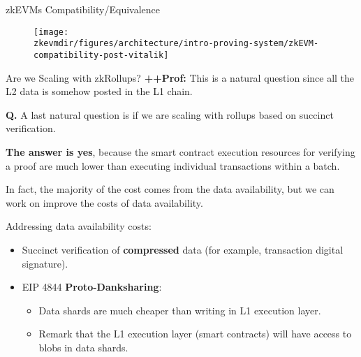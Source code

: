 \begin{frame}{zkEVMs Compatibility/Equivalence}
\begin{figure}
\texttt{[image: \\zkevmdir/figures/architecture/intro-proving-system/zkEVM-compatibility-post-vitalik]}
\end{figure}
\end{frame}




\begin{frame}{Are we Scaling with zkRollups?}
\ifPROF
\footnotesize
\textbf{++Prof:} This is a natural question since all the L2 data is somehow posted in the L1 chain.
\normalsize
\fi

\textbf{Q.} A last natural question is if we are scaling with rollups based on succinct verification.

\textbf{The answer is yes}, because the smart contract execution resources for verifying a proof are much lower
than executing individual transactions within a batch.


In fact, the majority of the cost comes from the data availability, but we can work on improve the costs of data availability.

\vspace{0.2cm}
Addressing data availability costs:
  \begin{itemize}
  \item Succinct verification of \textbf{compressed} data (for example, transaction digital signature).
  \item EIP 4844 \textbf{Proto-Danksharing}:
    \begin{itemize}
    \item Data shards are much cheaper than writing in L1 execution layer.
    \item Remark that the L1 execution layer (smart contracts) will have access to blobs in data shards.
    \end{itemize}
  \end{itemize}
\end{frame}
